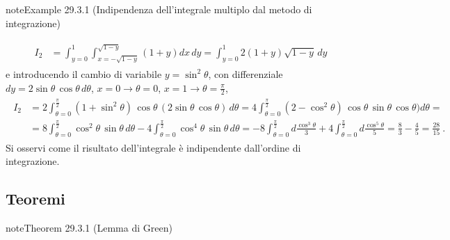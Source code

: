 \documentclass[letterpaper,10pt,italian]{jupyterBook}
\begin{document}
\begin{sphinxadmonition}{note}{Example 29.3.1 (Indipendenza dell’integrale multiplo dal metodo di integrazione)}
\begin{enumerate}
\end{enumerate}
\begin{equation*}
\begin{split}\begin{aligned}
I_2
& = \int_{y=0}^{1} \int_{x=-\sqrt{1-y}}^{\sqrt{1-y}} \left( 1 + y \right) dx \, dy 
  = \int_{y=0}^{1} 2 ( 1 + y )\sqrt{1-y} \, dy 
\end{aligned}\end{split}
\end{equation*}
\sphinxAtStartPar
e introducendo il cambio di variabile \(y = \sin^2 \theta\), con differenziale \(dy = 2 \sin \theta \, \cos \theta \, d \theta\), \(x=0 \rightarrow \theta = 0\), \(x = 1 \rightarrow \theta = \frac{\pi}{2}\),
\begin{equation*}
\begin{split}\begin{aligned}
I_2 
& =  2 \int_{\theta=0}^{\frac{\pi}{2}} (1 + \sin^2 \theta) \, \cos \theta \, ( 2 \sin \theta \, \cos \theta ) \, d \theta
  =  4 \int_{\theta=0}^{\frac{\pi}{2}} (2 - \cos^2 \theta) \, \cos \theta \, \sin \theta \, \cos \theta )  d \theta = \\
& =  8 \int_{\theta=0}^{\frac{\pi}{2}} \cos^2 \theta \, \sin \theta \,  d \theta
   - 4 \int_{\theta=0}^{\frac{\pi}{2}} \cos^4 \theta \, \sin \theta \,  d \theta 
  =- 8 \int_{\theta=0}^{\frac{\pi}{2}} d \frac{\cos^3 \theta}{3}
   + 4 \int_{\theta=0}^{\frac{\pi}{2}} d \frac{\cos^5 \theta}{5} 
  = \frac{8}{3} - \frac{4}{5} = \frac{28}{15} \ .
\end{aligned}\end{split}
\end{equation*}
\sphinxAtStartPar
Si osservi come il risultato dell’integrale è indipendente dall’ordine di integrazione.


\end{sphinxadmonition}


\subsection{Teoremi}
\label{\detokenize{ch/multivariable-calculus/integrals:teoremi}}\label{\detokenize{ch/multivariable-calculus/integrals:multivariable-calculus-integrals-thms}}\label{ch/multivariable-calculus/integrals:theorem-3}
\begin{sphinxadmonition}{note}{Theorem 29.3.1 (Lemma di Green)}


\end{sphinxadmonition}
\end{document}
